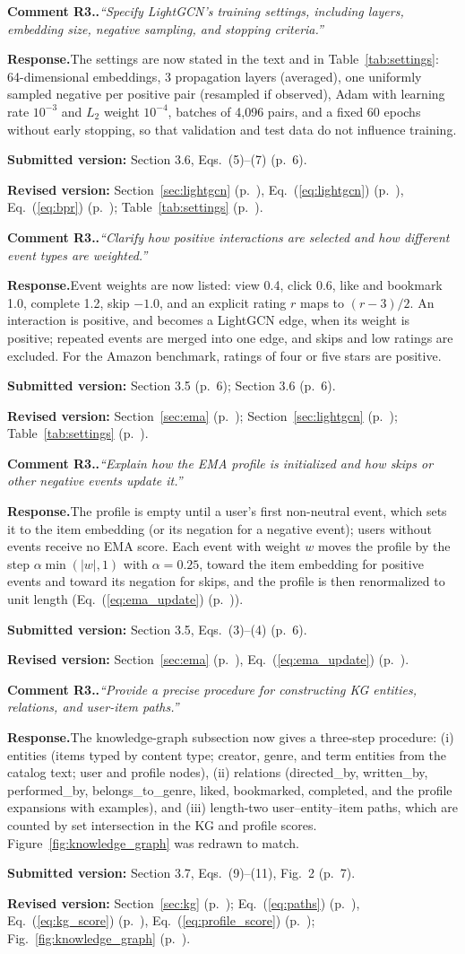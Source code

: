 \documentclass[10pt]{article}
\newcounter{rc}
\newcommand{\point}[2]{\stepcounter{rc}%
  \par\medskip\noindent\textbf{Comment #1.\arabic{rc}.}\enspace\textit{``#2''}\par}
\newcommand{\response}{\noindent\textbf{Response.}\enspace}
\newcommand{\where}[2]{\par\noindent\textbf{Submitted version:} #1\par\noindent\textbf{Revised version:} #2\par}
\newcommand{\sect}[1]{Section~\ref{#1} (p.~\pageref{#1})}
\newcommand{\tabl}[1]{Table~\ref{#1} (p.~\pageref{#1})}
\newcommand{\figr}[1]{Fig.~\ref{#1} (p.~\pageref{#1})}
\newcommand{\eqn}[1]{Eq.~(\ref{#1}) (p.~\pageref{#1})}
\begin{document}
\point{R3}{Specify LightGCN's training settings, including layers, embedding size, negative sampling, and stopping criteria.}
\response The settings are now stated in the text and in Table~\ref{tab:settings}: 64-dimensional embeddings, 3 propagation layers (averaged), one uniformly sampled negative per positive pair (resampled if observed), Adam with learning rate $10^{-3}$ and $L_2$ weight $10^{-4}$, batches of 4,096 pairs, and a fixed 60 epochs without early stopping, so that validation and test data do not influence training.
\where{Section 3.6, Eqs.~(5)--(7) (p.~6).}{\sect{sec:lightgcn}, \eqn{eq:lightgcn}, \eqn{eq:bpr}; \tabl{tab:settings}.}

\point{R3}{Clarify how positive interactions are selected and how different event types are weighted.}
\response Event weights are now listed: view 0.4, click 0.6, like and bookmark 1.0, complete 1.2, skip $-1.0$, and an explicit rating $r$ maps to $(r-3)/2$. An interaction is positive, and becomes a LightGCN edge, when its weight is positive; repeated events are merged into one edge, and skips and low ratings are excluded. For the Amazon benchmark, ratings of four or five stars are positive.
\where{Section 3.5 (p.~6); Section 3.6 (p.~6).}{\sect{sec:ema}; \sect{sec:lightgcn}; \tabl{tab:settings}.}

\point{R3}{Explain how the EMA profile is initialized and how skips or other negative events update it.}
\response The profile is empty until a user's first non-neutral event, which sets it to the item embedding (or its negation for a negative event); users without events receive no EMA score. Each event with weight $w$ moves the profile by the step $\alpha\min(|w|,1)$ with $\alpha=0.25$, toward the item embedding for positive events and toward its negation for skips, and the profile is then renormalized to unit length (\eqn{eq:ema_update}).
\where{Section 3.5, Eqs.~(3)--(4) (p.~6).}{\sect{sec:ema}, \eqn{eq:ema_update}.}

\point{R3}{Provide a precise procedure for constructing KG entities, relations, and user-item paths.}
\response The knowledge-graph subsection now gives a three-step procedure: (i) entities (items typed by content type; creator, genre, and term entities from the catalog text; user and profile nodes), (ii) relations (directed\_by, written\_by, performed\_by, belongs\_to\_genre, liked, bookmarked, completed, and the profile expansions with examples), and (iii) length-two user--entity--item paths, which are counted by set intersection in the KG and profile scores. Figure~\ref{fig:knowledge_graph} was redrawn to match.
\where{Section 3.7, Eqs.~(9)--(11), Fig.~2 (p.~7).}{\sect{sec:kg}; \eqn{eq:paths}, \eqn{eq:kg_score}, \eqn{eq:profile_score}; \figr{fig:knowledge_graph}.}
\end{document}
